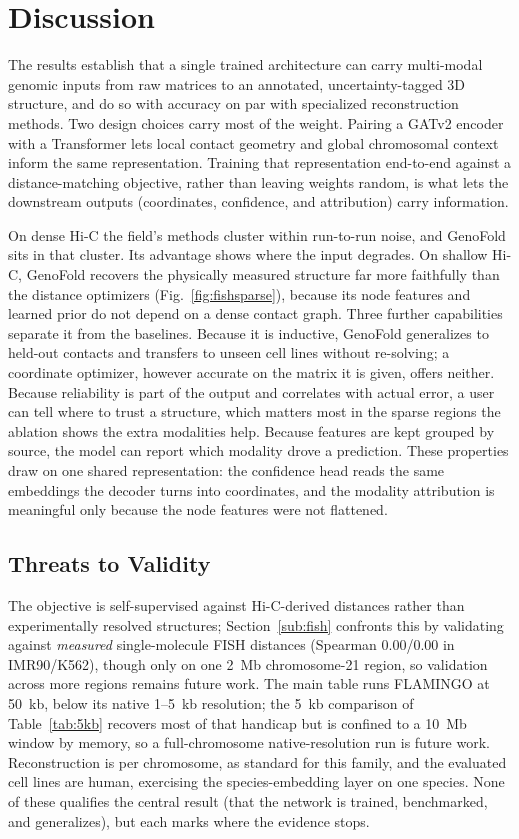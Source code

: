 \documentclass[conference]{IEEEtran}
\providecommand{\fishgeno}{0.00}
\providecommand{\fishgenok}{0.00}
\begin{document}
\section{Discussion}
The results establish that a single trained architecture can carry multi-modal
genomic inputs from raw matrices to an annotated, uncertainty-tagged 3D structure,
and do so with accuracy on par with specialized reconstruction methods. Two design
choices carry most of the weight. Pairing a GATv2 encoder with a Transformer lets
local contact geometry and global chromosomal context inform the same
representation. Training that representation end-to-end against a distance-matching
objective, rather than leaving weights random, is what lets the downstream outputs
(coordinates, confidence, and attribution) carry information.

On dense Hi-C the field's methods cluster within run-to-run noise, and GenoFold sits in
that cluster. Its advantage shows where the input degrades. On shallow Hi-C, GenoFold
recovers the physically measured structure far more faithfully than the distance
optimizers (Fig.~\ref{fig:fishsparse}), because its node features and learned prior do not
depend on a dense contact graph. Three further capabilities separate it from the baselines.
Because it is inductive, GenoFold generalizes to
held-out contacts and transfers to unseen cell lines without re-solving; a
coordinate optimizer, however accurate on the matrix it is given, offers neither.
Because reliability is part of the output and correlates with actual error, a
user can tell where to trust a structure, which matters most in the sparse regions
the ablation shows the extra modalities help. Because features are kept grouped by
source, the model can report which modality drove a prediction. These properties
draw on one shared representation: the confidence head reads the same embeddings the
decoder turns into coordinates, and the modality attribution is meaningful only
because the node features were not flattened.

\subsection{Threats to Validity}
The objective is self-supervised against Hi-C-derived distances rather than
experimentally resolved structures; Section~\ref{sub:fish} confronts this by validating
against \emph{measured} single-molecule FISH distances (Spearman \fishgeno{}/\fishgenok{}
in IMR90/K562), though only on one 2~Mb chromosome-21 region, so validation across more
regions remains future work. The main table runs FLAMINGO at 50~kb, below its native 1--5~kb resolution;
the 5~kb comparison of Table~\ref{tab:5kb} recovers most of that handicap but is confined
to a 10~Mb window by memory, so a full-chromosome native-resolution run is future work.
Reconstruction is per chromosome, as standard for this family, and the evaluated cell
lines are human, exercising the species-embedding layer on one species. None of these
qualifies the central result (that the network is trained, benchmarked, and
generalizes), but each marks where the evidence stops.
\end{document}
